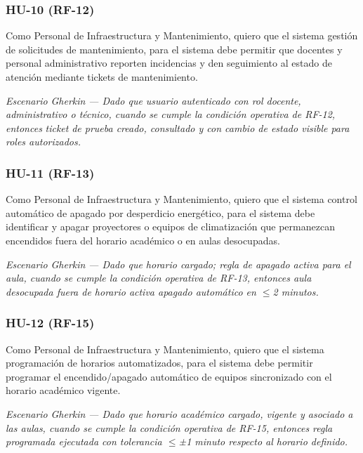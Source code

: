 \subsubsection*{HU-10 (RF-12)}


Como Personal de Infraestructura y Mantenimiento, quiero que el sistema gestión de solicitudes de mantenimiento, para el sistema debe permitir que docentes y personal administrativo reporten incidencias y den seguimiento al estado de atención mediante tickets de mantenimiento.


\textit{Escenario }\textit{Gherkin}\textit{ --- Dado que usuario autenticado con rol docente, administrativo o técnico, cuando se cumple la condición operativa de RF-12, entonces }\textit{ticket}\textit{ de prueba creado, consultado y con cambio de estado visible para roles autorizados.}


\subsubsection*{HU-11 (RF-13)}


Como Personal de Infraestructura y Mantenimiento, quiero que el sistema control automático de apagado por desperdicio energético, para el sistema debe identificar y apagar proyectores o equipos de climatización que permanezcan encendidos fuera del horario académico o en aulas desocupadas.


\textit{Escenario }\textit{Gherkin}\textit{ --- Dado que horario cargado; regla de apagado activa para el aula, cuando se cumple la condición operativa de RF-13, entonces aula desocupada fuera de horario activa apagado automático en $\leq$2 minutos.}


\subsubsection*{HU-12 (RF-15)}


Como Personal de Infraestructura y Mantenimiento, quiero que el sistema programación de horarios automatizados, para el sistema debe permitir programar el encendido/apagado automático de equipos sincronizado con el horario académico vigente.


\textit{Escenario }\textit{Gherkin}\textit{ --- Dado que horario académico cargado, vigente y asociado a las aulas, cuando se cumple la condición operativa de RF-15, entonces regla programada ejecutada con tolerancia $\leq$±1 minuto respecto al horario definido.}


